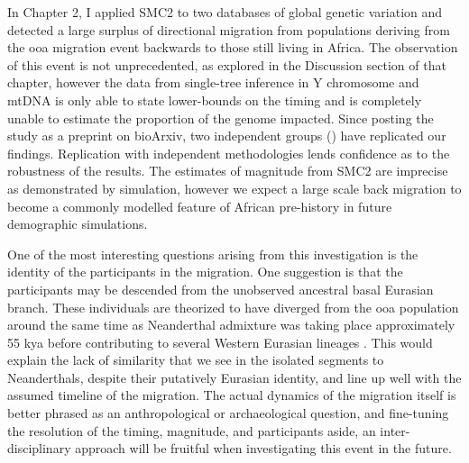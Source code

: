 In Chapter 2, I applied SMC2 to two databases of global genetic variation and detected a large surplus of directional migration from populations deriving from the \gls{ooa} migration event backwards to those still living in Africa. The observation of this event is not unprecedented, as explored in the Discussion section of that chapter, however the data from single-tree inference in Y chromosome and \gls{mtDNA} is only able to state lower-bounds on the timing and is completely unable to estimate the proportion of the genome impacted. Since posting the study as a preprint on bioArxiv, two independent groups (\textcite{Montinaro2020,Wang2021}) have replicated our findings. Replication with independent methodologies lends confidence as to the robustness of the results. The estimates of magnitude from SMC2 are imprecise as demonstrated by simulation, however we expect a large scale back migration to become a commonly modelled feature of African pre-history in future demographic simulations. 

One of the most interesting questions arising from this investigation is the identity of the participants in the migration. One suggestion is that the participants may be descended from the unobserved ancestral basal Eurasian branch. These individuals are theorized to have diverged from the \gls{ooa} population around the same time as Neanderthal admixture was taking place approximately 55 kya before contributing to several Western Eurasian lineages \cite{Lazaridis2016,Lazaridis2018}. This would explain the lack of similarity that we see in the isolated segments to Neanderthals, despite their putatively Eurasian identity, and line up well with the assumed timeline of the migration. The actual dynamics of the migration itself is better phrased as an anthropological or archaeological question, and fine-tuning the resolution of the timing, magnitude, and participants aside, an inter-disciplinary approach will be fruitful when investigating this event in the future.


